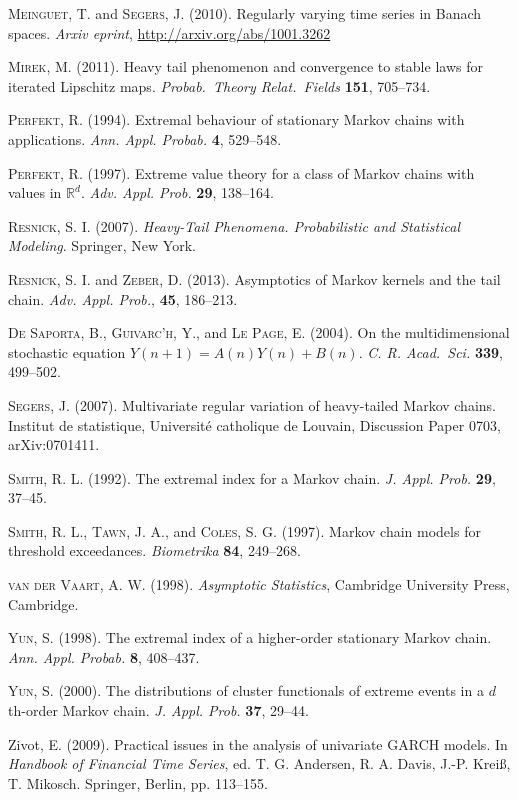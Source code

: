 \documentclass{aptpubarxiv}
\numberwithin{equation}{section}
\begin{document}
\begin{thebibliography}{}
\textsc{Meinguet, T.} and \textsc{Segers, J.} (2010). Regularly varying time series in Banach spaces. {\em Arxiv eprint\/}, \url{http://arxiv.org/abs/1001.3262}

\textsc{Mirek, M.} (2011). Heavy tail phenomenon and convergence to stable laws for iterated Lipschitz maps. {\em Probab.\ Theory Relat.\ Fields\/} {\bf 151}, 705--734.

\textsc{Perfekt, R.} (1994). Extremal behaviour of stationary Markov chains with applications. {\em Ann. Appl. Probab.\/} {\bf 4}, 529--548.

\textsc{Perfekt, R.} (1997). Extreme value theory for a class of Markov chains with values in ${\mathbb{R}}^d$. {\em Adv. Appl. Prob.\/} {\bf 29}, 138--164.

\textsc{Resnick, S. I.} (2007). {\em Heavy-Tail Phenomena. Probabilistic and Statistical Modeling}. Springer, New York.

\textsc{Resnick, S. I.} and \textsc{Zeber, D.} (2013). Asymptotics of Markov kernels and the tail chain. {\em Adv. Appl. Prob.\/}, {\bf 45}, 186--213.

\textsc{De Saporta, B.}, \textsc{Guivarc'h, Y.}, and \textsc{Le Page, E.} (2004). On the multidimensional stochastic equation $Y(n+1) = A(n)Y(n)+B(n)$. {\em C. R. Acad.\ Sci.\/} {\bf 339}, 499--502.

\textsc{Segers, J.} (2007). Multivariate regular variation of heavy-tailed {M}arkov chains. Institut de statistique, Universit\'e ca\-tholique de Louvain, Discussion Paper 0703,
arXiv:0701411.

\textsc{Smith, R. L.} (1992). The extremal index for a Markov chain. {\em J. Appl. Prob.\/} {\bf 29}, 37--45.

\textsc{Smith, R. L.}, \textsc{Tawn, J. A.}, and \textsc{Coles, S. G.} (1997). Markov chain models for threshold exceedances. {\em Biometrika\/} {\bf 84}, 249--268.

\textsc{van der Vaart, A. W.} (1998). {\em Asymptotic Statistics\/}, Cambridge University Press, Cambridge.

\textsc{Yun, S. (1998)}. The extremal index of a higher-order stationary Markov chain. {\em Ann. Appl. Probab.\/} {\bf 8}, 408--437.

\textsc{Yun, S.} (2000). The distributions of cluster functionals of extreme events in a $d$th-order Markov chain. {\em J. Appl. Prob.\/} {\bf 37}, 29--44.

{\sc Zivot, E.} (2009). Practical issues in the analysis of univariate GARCH models. In \emph{Handbook of Financial Time Series},
ed. T. G. Andersen, R. A. Davis, J.-P. Krei\ss, T. Mikosch. Springer, Berlin, pp. 113--155.
\end{thebibliography}
\end{document}
